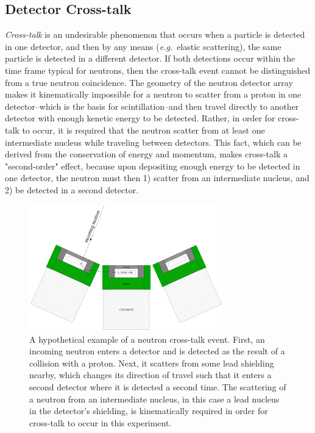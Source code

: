 \subsection{Detector Cross-talk}
\label{crosstalk}
\textit{Cross-talk} is an undesirable phenomenon that occurs when a particle is detected in one detector, and then by any means (\textit{e.g.}\ elastic scattering), the same particle is detected in a different detector.
If both detections occur within the time frame typical for neutrons, then the cross-talk event cannot be distinguished from a true neutron coincidence.
The geometry of the neutron detector array makes it kinematically impossible for a neutron to scatter from a proton in one detector--which is the basis for scintillation--and then travel directly to another detector with enough kenetic energy to be detected.
Rather, in order for cross-talk to occur, it is required that the neutron scatter from at least one intermediate nucleus while traveling between detectors.
This fact, which can be derived from the conservation of energy and momentum, makes cross-talk a "second-order" effect, because upon depositing enough energy to be detected in one detector, the neutron must then 1) scatter from an intermediate nucleus, and 2) be detected in a second detector.
\begin{figure}
    \centering
    \includegraphics[width = 0.75\textwidth]{Content/Errors/CrossTalkExample.png}
    \caption{A hypothetical example of a neutron cross-talk event.
First, an incoming neutron enters a detector and is detected as the result of a collision with a proton.
Next, it scatters from some lead shielding nearby, which changes its direction of travel such that it enters a second detector where it is detected a second time.
The scattering of a neutron from an intermediate nucleus, in this case a lead nucleus in the detector's shielding, is kinematically required in order for cross-talk to occur in this experiment.}
    \label{fig:CrossTalkExamplepng}
\end{figure}
